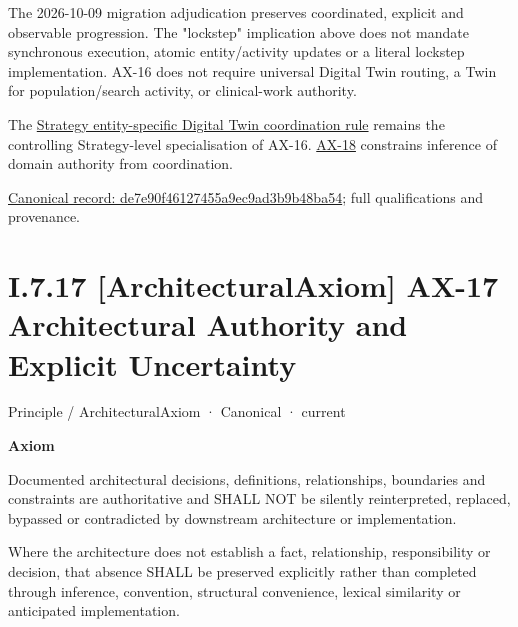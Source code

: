 The 2026-10-09 migration adjudication preserves coordinated, explicit and
observable progression. The "lockstep" implication above does not mandate
synchronous execution, atomic entity/activity updates or a literal lockstep
implementation. AX-16 does not require universal Digital Twin routing, a Twin
for population/search activity, or clinical-work authority.



The \href{\detokenize{../../../../../../../../../docs/markdown/02-strategy/strategic-views/logical-component-responsibilities.md#entity-specific-operational-coordination}}{Strategy entity-specific Digital Twin coordination rule}
remains the controlling Strategy-level specialisation of AX-16.
\hyperref[element:b8cafe3cf5904d2bb9a9767260fddf78]{AX-18} constrains inference of domain authority from coordination.


{\footnotesize \href{../../../../../../../../continuum/motivation/principle/de7e90f46127455a9ec9ad3b9b48ba54.md}{Canonical record: de7e90f46127455a9ec9ad3b9b48ba54}; full qualifications and provenance.}\par
\section*{I.7.17 [ArchitecturalAxiom] AX-17 Architectural Authority and Explicit Uncertainty}
\label{navigation:I.7.17}

\label{element:8882573df7ce43c6bc0f66da0a676139}
{\small Principle / ArchitecturalAxiom · Canonical · current}\par

\par\medskip\textbf{Axiom}\par


Documented architectural decisions, definitions, relationships, boundaries
and constraints are authoritative and SHALL NOT be silently reinterpreted,
replaced, bypassed or contradicted by downstream architecture or
implementation.



Where the architecture does not establish a fact, relationship,
responsibility or decision, that absence SHALL be preserved explicitly
rather than completed through inference, convention, structural
convenience, lexical similarity or anticipated implementation.



